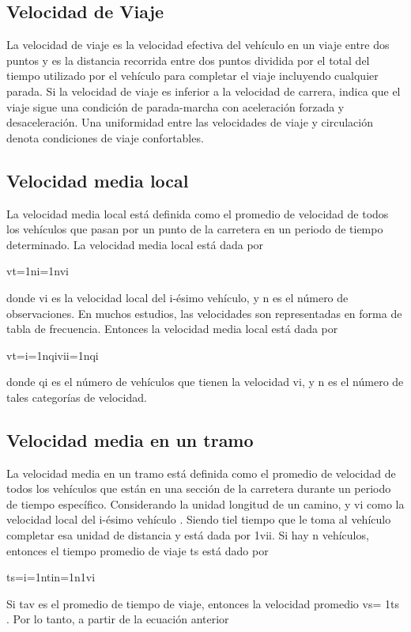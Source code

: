 \subsection{Velocidad de Viaje}

La velocidad de viaje es la velocidad efectiva del vehículo en un viaje entre dos puntos y es la distancia recorrida entre dos puntos dividida por el total del tiempo utilizado por el vehículo para completar el viaje incluyendo cualquier parada. Si la velocidad de viaje es inferior a la velocidad de carrera, indica que el viaje sigue una condición de parada-marcha con aceleración forzada y desaceleración. Una uniformidad entre las velocidades de viaje y circulación denota condiciones de viaje confortables.

\subsection{Velocidad media local}

La velocidad media local está definida como el promedio de velocidad de todos los vehículos que pasan por un punto de la carretera en un periodo de tiempo determinado. La velocidad media local está dada por

vt=1ni=1nvi

donde vi es la velocidad local del i-ésimo vehículo, y n es el número de observaciones. En  muchos estudios, las velocidades son representadas en forma de tabla de frecuencia. Entonces la velocidad media local está dada por

vt=i=1nqivii=1nqi

donde qi es el número de vehículos que tienen la velocidad vi, y n es el número de tales categorías de velocidad.

\subsection{Velocidad media en un tramo}

La velocidad media en un tramo está definida como el promedio de velocidad de todos los vehículos que están en una sección de la carretera durante un periodo de tiempo específico. Considerando la unidad longitud de un camino, y vi como la velocidad local del i-ésimo vehículo . Siendo tiel tiempo que le toma al vehículo completar esa unidad de distancia y está dada por 1vii. Si hay n vehículos, entonces el tiempo promedio de viaje ts está dado por

ts=i=1ntin=1n1vi

Si tav es el promedio de tiempo de viaje, entonces la velocidad promedio vs= 1ts . Por lo tanto, a partir de la ecuación anterior


